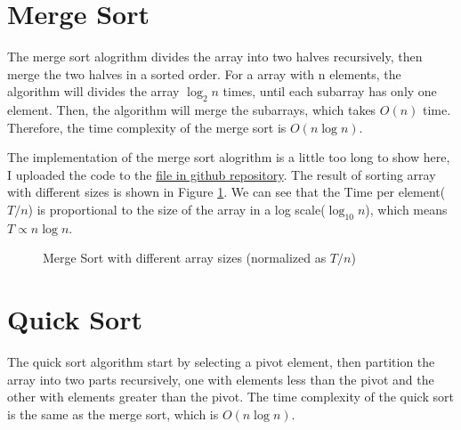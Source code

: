 \documentclass[a4paper,11pt]{article}
\begin{document}
\section*{Merge Sort}

The merge sort alogrithm divides the array into two halves recursively, then merge
the two halves in a sorted order. For a array with n elements, the algorithm will
divides the array $\log_2 n$ times, until each subarray has only one element.
Then, the algorithm will merge the subarrays, which takes $O(n)$ time. Therefore,
the time complexity of the merge sort is $O(n \log n)$.

The implementation of the merge sort alogrithm is a little too long to show here,
I uploaded the code to the \href{https://github.com/zebra314/ID1021-Algorithms-and-Data-Structures/blob/main/assignment\_4/merge\_sort.c}{file in github repository}.
The result of sorting array with different sizes is shown in Figure \ref{fig:merge-sort}.
We can see that the Time per element($T/n$) is proportional to the size of the array in a log scale($\log_{10}n$),
which means $T \propto n \log n$.
\begin{figure}[H]
  \centering
  \caption{Merge Sort with different array sizes (normalized as $T/n$)}
  \label{fig:merge-sort}
\end{figure}
  
\section*{Quick Sort}

The quick sort algorithm start by selecting a pivot element, then partition the array
into two parts recursively, one with elements less than the pivot and the other with elements greater
than the pivot. The time complexity of the quick sort is the same as the merge sort, which is $O(n \log n)$.
\end{document}
